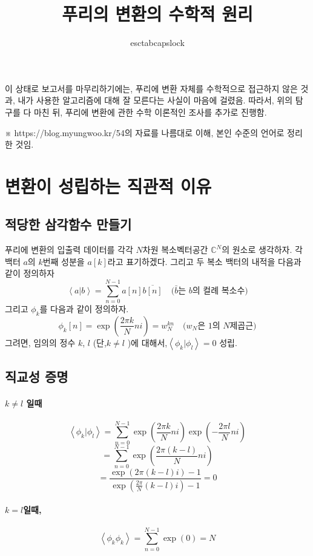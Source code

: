 \documentclass[section, oneside]{oblivoir}
\title{푸리의 변환의 수학적 원리}
\author{esctabcapslock }
\begin{document}
\maketitle


이 상태로 보고서를 마무리하기에는, 푸리에 변환 자체를 수학적으로 접근하지 않은 것과, 내가 사용한 알고리즘에 대해 잘 모른다는 사실이 마음에 걸렸음.
따라서, 위의 탐구를 다 마친 뒤, 푸리에 변환에 관한 수학 이론적인 조사를 추가로 진행함.

※ https://blog.myungwoo.kr/54의 자료를 나름대로 이해, 본인 수준의 언어로 정리한 것임.


\section{변환이 성립하는 직관적 이유 }

\subsection{적당한 삼각함수 만들기}
푸리에 변환의 입출력 데이터를 각각 $N$차원 복소벡터공간 $\mathbb{C}^N$의 원소로 생각하자.
각 백터 $a$의 $k$번째 성분을 $a[k]$라고 표기하겠다.
그리고 두 복소 백터의 내적을 다음과 같이 정의하자
$$\left\langle a|b \right\rangle = \sum _{n=0}^{N-1} a [n] \overline{ b[n]} \quad \text{(}\bar{b}\text{는 }b\text{의 컬례 복소수)}$$
그리고 $\phi_{k}$를 다음과 같이 정의하자.
$$\phi_k \left[n \right] = \exp \left( \frac{2 \pi k}{N} n i \right) =w _{N}^{kn} \quad (w _{N}\text{은 1의 }N\text{제곱근)}$$
그려면, 임의의 정수 $k$, $l$ (단,$k \neq l$ )에 대해서,$ \left\langle \phi_k | \phi_l \right\rangle = 0$  성립.


\subsection{직교성 증명} \label{chap:ortho}

\paragraph{$k \ne l$ 일때}
$$\left\langle \phi_k | \phi_l \right\rangle = \sum_{n=0}^{N-1} \exp \left(\frac{ 2 \pi k}{N} ni \right)  \exp \left( - \frac{ 2 \pi l}{N} ni \right)$$
$$ = \sum_{n=0}^{N-1} \exp \left(\frac{ 2 \pi (k-l)}{N} ni \right) $$
$$ = \frac{ \exp ( 2\pi(k-l)i) - 1}{\exp \left( \frac{2\pi}{N} (k-l)i\right)-1} =0$$
 
\paragraph{$k=l$일때,}
$$\left\langle \phi_k \phi_k \right\rangle = \sum_{n=0}^{N-1} \exp(0) = N$$
\end{document}

